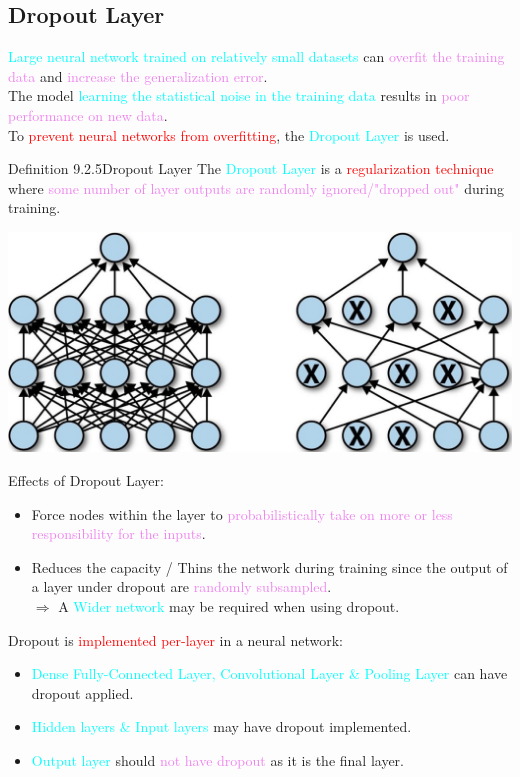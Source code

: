 \documentclass{book}
\begin{document}
\subsection{Dropout Layer}
\textcolor{cyan}{Large neural network trained on relatively small datasets} can \textcolor{violet}{overfit the training data} and \textcolor{violet}{increase the generalization error}.\\
The model \textcolor{cyan}{learning the statistical noise in the training data} results in \textcolor{violet}{poor performance on new data}.\\
To \textcolor{red}{prevent neural networks from overfitting}, the \textcolor{cyan}{Dropout Layer} is used.\\
\begin{defBox}{Definition 9.2.5}{Dropout Layer}
    The \textcolor{cyan}{Dropout Layer} is a \textcolor{red}{regularization technique} where \textcolor{violet}{some number of layer outputs are randomly ignored/"dropped out"} during training.
\end{defBox}
\begin{center}
    \includegraphics[scale=0.15]{chapter 9/ch9_figure9.jpeg}
\end{center}
Effects of Dropout Layer:
\begin{itemize}
    \item Force nodes within the layer to \textcolor{violet}{probabilistically take on more or less responsibility for the inputs}.
    \item Reduces the capacity / Thins the network during training since the output of a layer under dropout are \textcolor{violet}{randomly subsampled}.\\
    $\Rightarrow$ A \textcolor{cyan}{Wider network} may be required when using dropout.
\end{itemize}
Dropout is \textcolor{red}{implemented per-layer} in a neural network:
\begin{itemize}
    \item \textcolor{cyan}{Dense Fully-Connected Layer, Convolutional Layer \& Pooling Layer} can have dropout applied.
    \item \textcolor{cyan}{Hidden layers \& Input layers} may have dropout implemented.
    \item \textcolor{cyan}{Output layer} should \textcolor{violet}{not have dropout} as it is the final layer.
\end{itemize}
\end{document}
